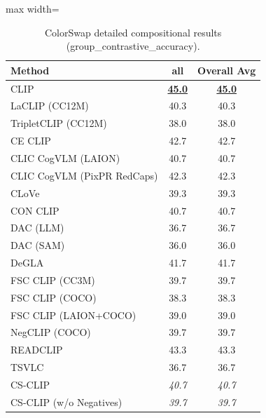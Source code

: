 \begin{table}[t]
  \centering
  \scriptsize
  \caption{ColorSwap detailed compositional results (group_contrastive_accuracy).}
  \label{tab:ColorSwap_detailed}
  \begin{adjustbox}{max width=\textwidth}
  \setlength{\tabcolsep}{2pt}
  \begin{tabular}{p{5cm}c|c}
    \toprule
    Method & all & Overall Avg \\
    \midrule
    CLIP & \underline{\textbf{45.0}} & \underline{\textbf{45.0}} \\
    \midrule
    LaCLIP (CC12M) & 40.3 & 40.3 \\
    TripletCLIP (CC12M) & 38.0 & 38.0 \\
    \midrule
    CE CLIP & 42.7 & 42.7 \\
    CLIC CogVLM (LAION) & 40.7 & 40.7 \\
    CLIC CogVLM (PixPR RedCaps) & 42.3 & 42.3 \\
    CLoVe & 39.3 & 39.3 \\
    CON CLIP & 40.7 & 40.7 \\
    DAC (LLM) & 36.7 & 36.7 \\
    DAC (SAM) & 36.0 & 36.0 \\
    DeGLA & 41.7 & 41.7 \\
    FSC CLIP (CC3M) & 39.7 & 39.7 \\
    FSC CLIP (COCO) & 38.3 & 38.3 \\
    FSC CLIP (LAION+COCO) & 39.0 & 39.0 \\
    NegCLIP (COCO) & 39.7 & 39.7 \\
    READCLIP & 43.3 & 43.3 \\
    TSVLC & 36.7 & 36.7 \\
    \midrule
    CS-CLIP & \emph{40.7} & \emph{40.7} \\
    CS-CLIP (w/o Negatives) & \emph{39.7} & \emph{39.7} \\
    \bottomrule
  \end{tabular}
  \end{adjustbox}
\end{table}

